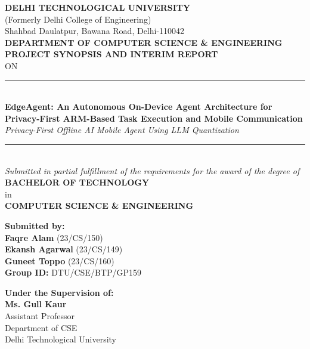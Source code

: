 \documentclass[12pt,a4paper,oneside]{report}
\begin{document}
\begin{titlepage}
\begin{center}
    {\large \textbf{DELHI TECHNOLOGICAL UNIVERSITY}}\\[0.2cm]
    {\normalsize (Formerly Delhi College of Engineering)}\\[0.2cm]
    {\normalsize Shahbad Daulatpur, Bawana Road, Delhi-110042}\\[0.8cm]

    {\large \textbf{DEPARTMENT OF COMPUTER SCIENCE \& ENGINEERING}}\\[1.5cm]

    {\Large \textbf{PROJECT SYNOPSIS AND INTERIM REPORT}}\\[0.3cm]
    {\normalsize ON}\\[0.5cm]

    \rule{\linewidth}{1.2pt}\\[0.4cm]
    {\LARGE \textbf{EdgeAgent: An Autonomous On-Device Agent Architecture for Privacy-First ARM-Based Task Execution and Mobile Communication}}\\[0.2cm]
    {\large \textit{Privacy-First Offline AI Mobile Agent Using LLM Quantization}}\\[0.2cm]
    \rule{\linewidth}{1.2pt}\\[1.2cm]

    \textit{Submitted in partial fulfillment of the requirements for the award of the degree of}\\[0.3cm]
    {\large \textbf{BACHELOR OF TECHNOLOGY}}\\[0.2cm]
    {\normalsize in}\\[0.2cm]
    {\large \textbf{COMPUTER SCIENCE \& ENGINEERING}}\\[1.2cm]

    \begin{minipage}{0.45\textwidth}
        \begin{flushleft} \large
            \textbf{Submitted by:}\\[0.2cm]
            \textbf{Faqre Alam} (23/CS/150)\\
            \textbf{Ekansh Agarwal} (23/CS/149)\\
            \textbf{Guneet Toppo} (23/CS/160)\\[0.2cm]
            \textbf{Group ID:} DTU/CSE/BTP/GP159
        \end{flushleft}
    \end{minipage}
    \hfill
    \begin{minipage}{0.45\textwidth}
        \begin{flushright} \large
            \textbf{Under the Supervision of:}\\[0.2cm]
            \textbf{Ms. Gull Kaur}\\
            Assistant Professor\\
            Department of CSE\\
            Delhi Technological University
        \end{flushright}
    \end{minipage}


\end{center}
\end{titlepage}
\end{document}
